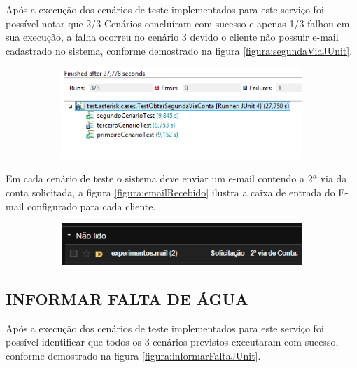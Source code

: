 Após a execução dos cenários de teste implementados para este serviço foi possível notar que 2/3 Cenários concluíram com sucesso e apenas 1/3 falhou em sua execução, a falha ocorreu no cenário 3 devido o cliente não possuir e-mail cadastrado no sistema, conforme demostrado na figura \ref{figura:segundaViaJUnit}.	
 \begin{figure}[H]
 	\centering
		\caption{\textbf{Obter 2ª Via de Conta - Detalhes execução dos testes}}
		\label{figura:segundaViaJUnit}
 	\begin{subfigure}[H]{\textwidth}
 		\centering
 		\includegraphics{figuras/cenarios/segunda_via/junit_result.PNG}
 	\end{subfigure}
 \end{figure}	
	

Em cada cenário de teste o sistema deve enviar um e-mail contendo a 2ª via da conta solicitada, a figura \ref{figura:emailRecebido} ilustra a caixa de entrada do E-mail configurado para cada cliente.
\begin{figure}[H]
	\centering
	\caption{\textbf{Obter 2ª Via de Conta - E-mail recebido pelo cliente}}
	\label{figura:emailRecebido}
	\begin{subfigure}[H]{\textwidth}
		\centering
		\includegraphics{figuras/cenarios/segunda_via/envio_email.PNG}
	\end{subfigure}
\end{figure}

	
\subsection{\textbf{\uppercase{Informar Falta de Água}}}

 Após a execução dos cenários de teste implementados para este serviço foi possível identificar que todos os 3 cenários previstos executaram com sucesso, conforme demostrado na figura \ref{figura:informarFaltaJUnit}.	

